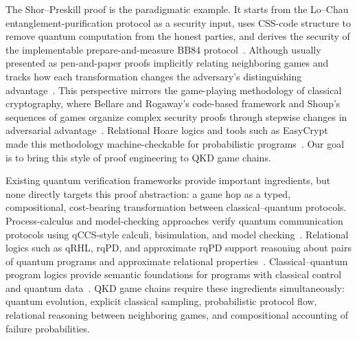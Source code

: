 \documentclass[conference,compsoc]{IEEEtran}
\newcommand{\bb}{\textsf{BB84}\xspace}
\begin{document}
The Shor--Preskill proof is the paradigmatic example. It starts from the Lo--Chau entanglement-purification protocol as a security input, uses CSS-code structure to remove quantum computation from the honest parties, and derives the security of the implementable prepare-and-measure \bb protocol~\cite{shor2000simple}. Although usually presented as pen-and-paper proofs implicitly relating neighboring games and tracks how each transformation changes the adversary's distinguishing advantage~\cite{renner2008security}. This perspective mirrors the game-playing methodology of classical cryptography, where Bellare and Rogaway's code-based framework and Shoup's sequences of games organize complex security proofs through stepwise changes in adversarial advantage~\cite{bellare2006codebased,shoup2004sequences}. Relational Hoare logics and tools such as EasyCrypt made this methodology machine-checkable for probabilistic programs~\cite{benton2004simple,barthe2009formal,barthe2011computer,barthe2012probabilistic,easycrypt,barthe2013probabilistic,barthe2016couplings,barthe2017uniformity,sok2021computeraided}. Our goal is to bring this style of proof engineering to QKD game chains.

Existing quantum verification frameworks provide important ingredients, but none directly targets this proof abstraction: a game hop as a typed, compositional, cost-bearing transformation between classical--quantum protocols. Process-calculus and model-checking approaches verify quantum communication protocols using qCCS-style calculi, bisimulation, and model checking~\cite{feng2007probabilistic,gay2008qmc,deng2012openbisimulation,feng2014symbolicbisimulation,feng2015qpmc,kubota2016semiautomated,qin2020groundbisimulation}. Relational logics such as qRHL, rqPD, and approximate rqPD support reasoning about pairs of quantum programs and approximate relational properties~\cite{unruh2019qrhl,barthe2020relational,li2021expectation,yan2024approximate,barthe2025complete}. Classical--quantum program logics provide semantic foundations for programs with classical control and quantum data~\cite{dhondt2006quantum,ying2011floyd,ying2016foundations,zhou2019applied,feng2021qhlclassical}. QKD game chains require these ingredients simultaneously: quantum evolution, explicit classical sampling, probabilistic protocol flow, relational reasoning between neighboring games, and compositional accounting of failure probabilities.
\end{document}
